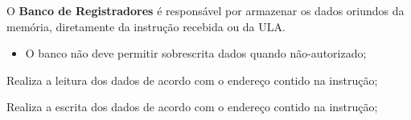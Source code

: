 
	O \textbf{Banco de Registradores }é responsável por armazenar os dados oriundos da memória, diretamente da instrução recebida ou da ULA.

	\actors
    \begin{description}
    \end{description}


\postconditions
    \begin{itemize}
     \item O banco não deve permitir sobrescrita dados quando não-autorizado;
     \end{itemize}

	\begin{mainflow}
    \item Realiza a leitura dos dados de acordo com o endereço contido na instrução;
    \item Realiza a escrita dos dados de acordo com o endereço contido na instrução;
  	\end{mainflow}